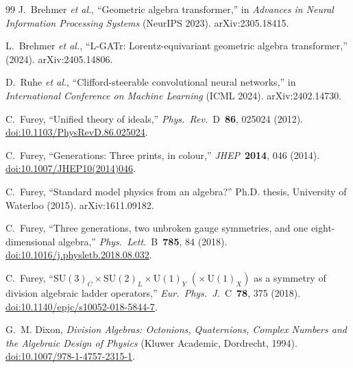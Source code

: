 \documentclass[12pt]{article}
\theoremstyle{definition}
\theoremstyle{remark}
\newcommand{\su}{\mathrm{SU}}           %
\begin{document}
\begin{thebibliography}{99}
		J.~Brehmer \textit{et al.},
		``Geometric algebra transformer,''
		in \textit{Advances in Neural Information Processing Systems} (NeurIPS 2023).
		arXiv:2305.18415.
		
		L.~Brehmer \textit{et al.},
		``L-GATr: Lorentz-equivariant geometric algebra transformer,''
		(2024).
		arXiv:2405.14806.
		
		D.~Ruhe \textit{et al.},
		``Clifford-steerable convolutional neural networks,''
		in \textit{International Conference on Machine Learning} (ICML 2024).
		arXiv:2402.14730.
		
		
		C.~Furey,
		``Unified theory of ideals,''
		\textit{Phys.\ Rev.}\ D~\textbf{86}, 025024 (2012).
		\href{https://doi.org/10.1103/PhysRevD.86.025024}{doi:10.1103/PhysRevD.86.025024}.
		
		C.~Furey,
		``Generations: Three prints, in colour,''
		\textit{JHEP}~\textbf{2014}, 046 (2014).
		\href{https://doi.org/10.1007/JHEP10(2014)046}{doi:10.1007/JHEP10(2014)046}.
		
		C.~Furey,
		``Standard model physics from an algebra?''
		Ph.D. thesis, University of Waterloo (2015).
		arXiv:1611.09182.
		
		C.~Furey,
		``Three generations, two unbroken gauge symmetries, and one
		eight-dimensional algebra,''
		\textit{Phys.\ Lett.}\ B~\textbf{785}, 84 (2018).
		\href{https://doi.org/10.1016/j.physletb.2018.08.032}{doi:10.1016/j.physletb.2018.08.032}.
		
		C.~Furey,
		``$\su(3)_C\times\su(2)_L\times\mathrm{U}(1)_Y$
		$(\times\,\mathrm{U}(1)_X)$ as a symmetry of division algebraic ladder
		operators,''
		\textit{Eur.\ Phys.\ J.}\ C~\textbf{78}, 375 (2018).
		\href{https://doi.org/10.1140/epjc/s10052-018-5844-7}{doi:10.1140/epjc/s10052-018-5844-7}.
		
		G.~M. Dixon,
		\textit{Division Algebras: Octonions, Quaternions, Complex Numbers and the
			Algebraic Design of Physics}
		(Kluwer Academic, Dordrecht, 1994).
		\href{https://doi.org/10.1007/978-1-4757-2315-1}{doi:10.1007/978-1-4757-2315-1}.
		

\end{thebibliography}
\end{document}
